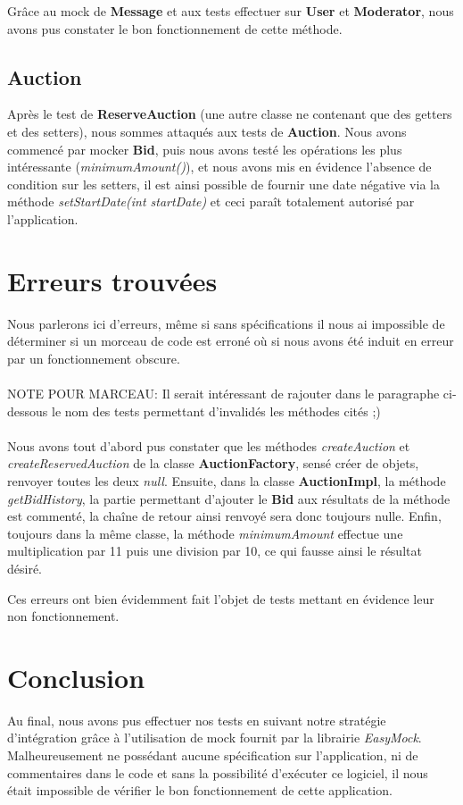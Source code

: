 \documentclass{article}
\begin{document}
Grâce au mock de \textbf{Message} et aux tests effectuer sur \textbf{User} et \textbf{Moderator}, nous avons pus constater le bon fonctionnement de cette méthode.

\subsection{Auction}
Après le test de \textbf{ReserveAuction} (une autre classe ne contenant que des getters et des setters), nous sommes attaqués aux tests de \textbf{Auction}. Nous avons commencé par mocker \textbf{Bid}, puis nous avons testé les opérations les plus intéressante (\textit{minimumAmount()}), et nous avons mis en évidence l'absence de condition sur les setters, il est ainsi possible de fournir une date négative via la méthode \textit{setStartDate(int startDate)} et ceci paraît totalement autorisé par l'application.

\section{Erreurs trouvées}
Nous parlerons ici d'erreurs, même si sans spécifications il nous ai impossible de déterminer si un morceau de code est erroné où si nous avons été induit en erreur par un fonctionnement obscure.
\\ ~\\
NOTE POUR MARCEAU: Il serait intéressant de rajouter dans le paragraphe ci-dessous le nom des tests permettant d'invalidés les méthodes cités ;)
\\ ~ \\
Nous avons tout d'abord pus constater que les méthodes \textit{createAuction} et \textit{createReservedAuction} de la classe \textbf{AuctionFactory}, sensé créer de objets, renvoyer toutes les deux \textit{null}. Ensuite, dans la classe \textbf{AuctionImpl}, la méthode \textit{getBidHistory}, la partie permettant d'ajouter le \textbf{Bid} aux résultats de la méthode est commenté, la chaîne de retour ainsi renvoyé sera donc toujours nulle. Enfin, toujours dans la même classe, la méthode \textit{minimumAmount} effectue une multiplication par 11 puis une division par 10, ce qui fausse ainsi le résultat désiré.

Ces erreurs ont bien évidemment fait l'objet de tests mettant en évidence leur non fonctionnement.

\newpage
\section*{Conclusion}
Au final, nous avons pus effectuer nos tests en suivant notre stratégie d'intégration grâce à l'utilisation de mock fournit par la librairie \textit{EasyMock}. Malheureusement ne possédant aucune spécification sur l'application, ni de commentaires dans le code et sans la possibilité d'exécuter ce logiciel, il nous était impossible de vérifier le bon fonctionnement de cette application.
\end{document}
